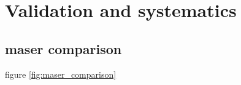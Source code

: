 \section{Validation and systematics}

\subsection{\citet{2009ApJ...700..137R} maser comparison}
figure \ref{fig:maser_comparison}